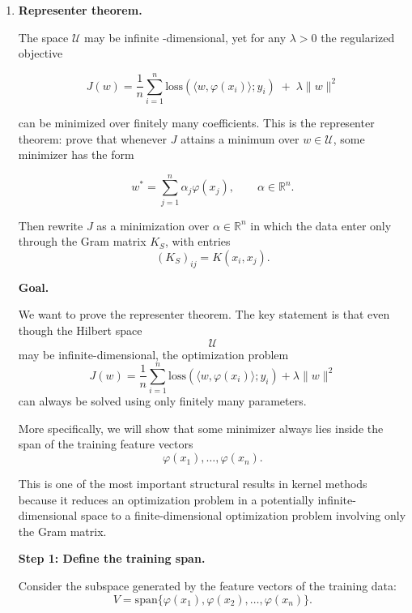 \documentclass[11pt]{article}
\begin{document}
\begin{enumerate}
\begin{solutionbox}
Even if the feature map $\\varphi(x)$ lives in an infinite-dimensional Hilbert space, the class can still have controlled complexity as long as the RKHS norm and kernel diagonal terms remain bounded.
\end{solutionbox}

\item \textbf{Representer theorem.}

The space $\mathcal{U}$ may be infinite \hyp dimensional, yet for any $\lambda > 0$ 
the regularized objective

\[
J(w) 
= 
\frac{1}{n} \sum_{i=1}^n 
\mathrm{loss}\!\left( \langle w, \varphi(x_i) \rangle ; y_i \right)
\;+\;
\lambda \|w\|^2
\]

can be minimized over finitely many coefficients. This is the representer theorem: 
prove that whenever $J$ attains a minimum over $w \in \mathcal{U}$, some minimizer has the form

\[
w^\ast = \sum_{j=1}^n \alpha_j \varphi(x_j), 
\qquad 
\alpha \in \mathbb{R}^n.
\]

Then rewrite $J$ as a minimization over $\alpha \in \mathbb{R}^n$ in which the data enter 
only through the Gram matrix $K_S$, with entries
\[
(K_S)_{ij} = K(x_i, x_j).
\]

\begin{solutionbox}

\textbf{Goal.}

We want to prove the representer theorem. The key statement is that even though the Hilbert space
\[
\mathcal U
\]
may be infinite-dimensional, the optimization problem
\[
J(w)
=
\frac1n
\sum_{i=1}^n
\mathrm{loss}(\langle w,\varphi(x_i)\rangle;y_i)
+
\lambda\|w\|^2
\]
can always be solved using only finitely many parameters.

More specifically, we will show that some minimizer always lies inside the span of the training feature vectors
\[
\varphi(x_1),\ldots,\varphi(x_n).
\]

This is one of the most important structural results in kernel methods because it reduces an optimization problem in a potentially infinite-dimensional space to a finite-dimensional optimization problem involving only the Gram matrix.

\medskip

\textbf{Step 1: Define the training span.}

Consider the subspace generated by the feature vectors of the training data:
\[
V
=
\mathrm{span}
\{
\varphi(x_1),
\varphi(x_2),
\ldots,
\varphi(x_n)
\}.
\]


\end{solutionbox}
\end{enumerate}
\end{document}
